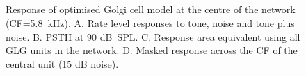 \begin{figure}[htb]
  \centering
  \hspace{0.5\textwidth}\hfill\\
\\
  \hspace{0.5\textwidth}\hfill\\
  \\
\caption[Optimised Golgi cell model responses]{Response of optimised Golgi cell model at the centre of the network (CF=5.8~kHz). A. Rate level responses to tone, noise and tone plus noise. B. PSTH at 90 dB~SPL.  C. Response area equivalent using all GLG units in the network. D. Masked response across the CF of the central unit (15 dB noise).} \label{fig:Golgi_verification}
\end{figure}







